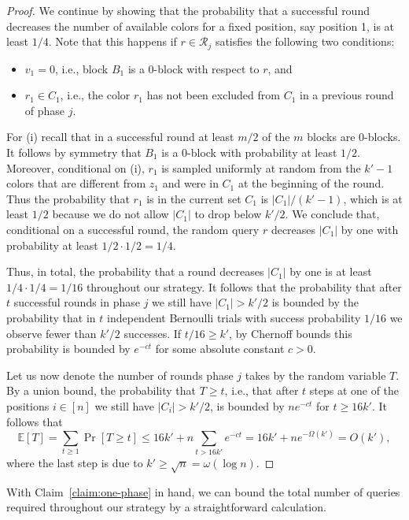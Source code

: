 \documentclass[english,a4paper,11pt]{article}
\newcommand{\cR}{{\mathcal{R}}}
\begin{document}
{\begin{proof}
We continue by showing that the probability that a successful round decreases the number of available colors for a fixed position, say position 1, is at least $1/4$. Note that this happens if $r \in \cR_j$ satisfies the following two conditions:
\begin{itemize}
\item[(i)] $v_1=0$, i.e., block $B_1$ is a 0-block with respect to $r$, and
\item[(ii)] $r_1\in C_1$, i.e., the color $r_1$ has not been excluded from $C_1$ in a previous round of phase $j$.
\end{itemize}
 For (i) recall that in a successful round at least $m/2$ of the $m$ blocks are $0$-blocks. It follows by symmetry that $B_1$ is a 0-block with probability at least $1/2$. Moreover, conditional on (i), $r_1$ is sampled uniformly at random from the $k'-1$ colors that are different from $z_1$ and were in $C_1$ at the beginning of the round. Thus the probability that $r_1$ is in the current set $C_1$ is $|C_1|/(k'-1)$, which is at least $1/2$ because we do not allow $|C_1|$ to drop below $k'/2$. We conclude that, conditional on a successful round, the random query $r$ decreases $|C_1|$ by one with probability at least $1/2\cdot 1/2=1/4$.

Thus, in total, the probability that a round decreases $|C_1|$ by one is at least $1/4\cdot 1/4=1/16$ throughout our strategy. It follows that the probability that after $t$ successful rounds in phase $j$ we 
still have $|C_1|>k'/2$ is bounded by the probability that in $t$ independent Bernoulli trials with  success probability $1/16$ we observe fewer than $k'/2$ successes. If $t/16\geq k'$, by Chernoff bounds this probability is bounded by $e^{-ct}$ for some absolute constant $c>0$. 

Let us now denote the number of rounds phase $j$ takes by the random variable $T$. By a union bound, the probability that $T\geq t$, i.e., that after $t$ steps at one of the positions $i\in[n]$ we still have $|C_i|>k'/2$, is bounded by $ne^{-ct}$ for $t\geq 16k'$. It follows that \begin{equation}
\mathbb E[T] =  \sum_{t \ge 1} \Pr[ T \ge t ] 
\le  16k' + n  \sum_{t > 16k'} e^{-ct} =  16k' + n  e^{-\Omega(k')}= O(k'),
\end{equation}
where the last step is due to $k'\geq \sqrt{n}=\omega(\log n)$.
\end{proof}

With Claim~\ref{claim:one-phase} in hand, we can bound the total number of queries  required throughout our strategy by a straightforward calculation.

}
\end{document}
